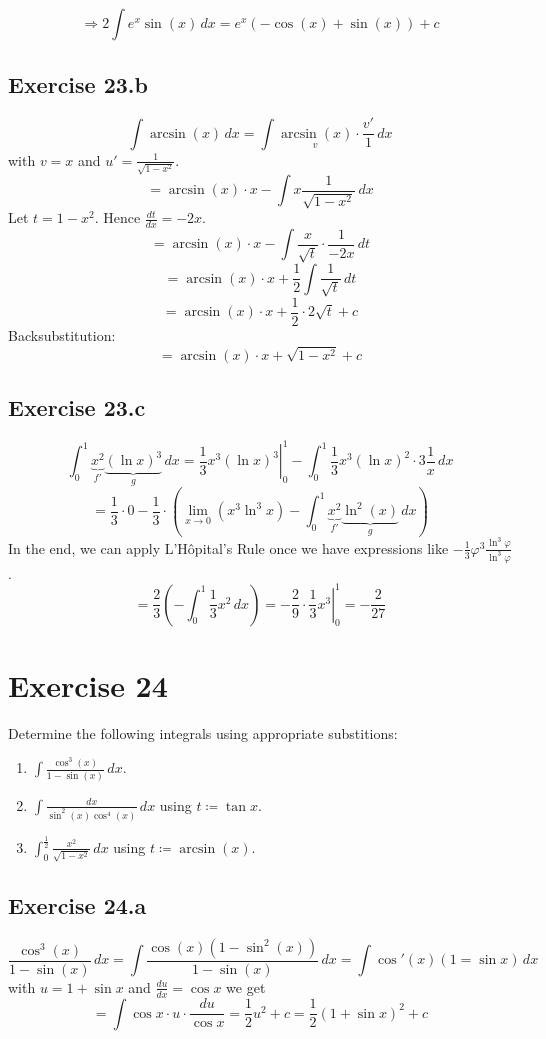 \documentclass[a4paper]{article}
\theoremstyle{definition}
\begin{document}
\[ \Rightarrow 2 \int e^x \sin(x) \, dx = e^x \left(-\cos(x) + \sin(x)\right) + c \]

\subsection{Exercise 23.b}
\[
  \int \arcsin(x) \, dx = \int \underset{v}{\arcsin(x)} \cdot \frac{v'}{1} \, dx
\]
with $v = x$ and $u' = \frac{1}{\sqrt{1 - x^2}}$.
\[ = \arcsin(x) \cdot x - \int x \frac{1}{\sqrt{1 - x^2}} \, dx \]
Let $t = 1 - x^2$. Hence $\frac{dt}{dx} = -2x$.
\[ = \arcsin(x) \cdot x - \int \frac{x}{\sqrt{t}} \cdot \frac{1}{-2x} \, dt \]
\[ = \arcsin(x) \cdot x + \frac12 \int \frac{1}{\sqrt{t}} \, dt \]
\[ = \arcsin(x) \cdot x + \frac12 \cdot 2 \sqrt{t} + c \]
Backsubstitution:
\[ = \arcsin(x) \cdot x + \sqrt{1 - x^2} + c \]

\subsection{Exercise 23.c}
\[
  \int_0^1 \underbrace{x^2}_{f'} \underbrace{\left(\ln{x}\right)^3}_{g} \, dx
  = \left.\frac13 x^3 \left(\ln{x}\right)^3 \right|_0^1 - \int_0^1 \frac13 x^3 \left(\ln{x}\right)^2 \cdot 3 \frac1x \, dx
\] \[
  = \frac13 \cdot 0 - \frac13 \cdot \left(
    \lim_{x\to 0} (x^3 \ln^3{x})
    - \int_0^1 \underbrace{x^2}_{f'} \underbrace{\ln^2(x)}_{g} \, dx
  \right)
\]
In the end, we can apply L'H\^opital's Rule once we have expressions like $-\frac13 \varphi^3 \frac{\ln^3{\varphi}}{\ln^3{\varphi}}$.
\[
  = \frac23 \left(- \int_0^1 \frac13 x^2 \, dx\right)
  = \left. -\frac29 \cdot \frac13 x^3 \right|_0^1 = -\frac{2}{27}
\]

\section{Exercise 24}
\begin{ex}
  Determine the following integrals using appropriate substitions:
  \begin{enumerate}
    \item $\int \frac{\cos^3(x)}{1 - \sin(x)} \, dx$.
    \item $\int \frac{dx}{\sin^2(x) \cos^4(x)} \, dx$ using $t \coloneqq \tan{x}$.
    \item $\int_0^{\frac12} \frac{x^2}{\sqrt{1 - x^2}} \, dx$ using $t \coloneqq \arcsin(x)$.
  \end{enumerate}
\end{ex}

\subsection{Exercise 24.a}
\[
  \frac{\cos^3(x)}{1 - \sin(x)} \, dx
  = \int \frac{\cos(x)\left(1 - \sin^2(x)\right)}{1 - \sin(x)} \, dx
  = \int \cos'(x) \left(1 = \sin{x}\right) \, dx
\]
with $u = 1 + \sin{x}$ and $\frac{du}{dx} = \cos{x}$ we get
\[
   = \int \cos{x} \cdot u \cdot \frac{du}{\cos{x}}
   = \frac12 u^2 + c = \frac12 \left(1 + \sin{x}\right)^2 + c
\]
\end{document}
